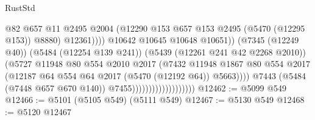 \begin{lexlean}{RustStd}
\begin{coremodule}
                                                        @82
                                                        @657
                                                        @11
                                                        @2495
                                                        @2004
                                                        (@12290
                                                          @153
                                                          @657
                                                          @153
                                                          @2495
                                                          (@5470 (@12295 @153))
                                                          @8880)
                                                        @12361))))
                                                @10642
                                                @10645
                                                @10648
                                                @10651))
                                            (@7345 (@12249 @40))
                                            (@5484 (@12254 @139 @241))
                                            (@5439 (@12261 @241 @42 @2268 @2010))
                                            (@5727
                                              @11948
                                              @80
                                              @554
                                              @2010
                                              @2017
                                              (@7432
                                                @11948
                                                @1867
                                                @80
                                                @554
                                                @2017
                                                (@12187
                                                  @64
                                                  @554
                                                  @64
                                                  @2017
                                                  (@5470 (@12192 @64))
                                                  @5663))))
                                          @7443
                                          (@5484 (@7448 @657 @670 @140))
                                          @7455)))))))))))))))))))
@12462 := @5099 @549
@12466 := @5101 (@5105 @549) (@5111 @549)
@12467 := @5130 @549
@12468 := @5120 @12467

\end{coremodule}
\end{lexlean}
